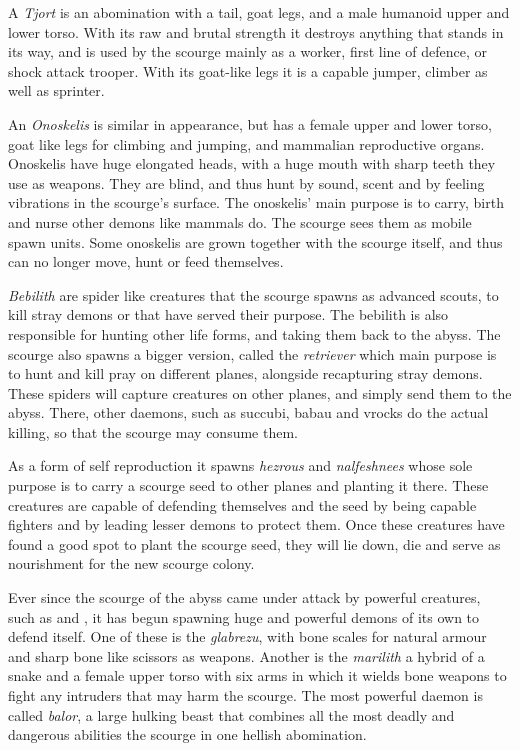 A \emph{Tjort} is an abomination with a tail, goat legs, and a male humanoid
upper and lower torso. With its raw and brutal strength it destroys anything
that stands in its way, and is used by the scourge mainly as a worker, first
line of defence, or shock attack trooper. With its goat-like legs it is a
capable jumper, climber as well as sprinter.

An \emph{Onoskelis} is similar in appearance, but has a female upper and lower
torso, goat like legs for climbing and jumping, and mammalian reproductive
organs. Onoskelis have huge elongated heads, with a huge mouth with sharp
teeth they use as weapons. They are blind, and thus hunt by sound, scent and
by feeling vibrations in the scourge's surface. The onoskelis' main purpose is
to carry, birth and nurse other demons like mammals do. The scourge sees them
as mobile spawn units. Some onoskelis are grown together with the scourge
itself, and thus can no longer move, hunt or feed themselves.

\emph{Bebilith} are spider like creatures that the scourge spawns as advanced
scouts, to kill stray demons or that have served their purpose. The bebilith
is also responsible for hunting other life forms, and taking them back to the
abyss. The scourge also spawns a bigger version, called the \emph{retriever}
which main purpose is to hunt and kill pray on different planes, alongside
recapturing stray demons. These spiders will capture creatures on other planes,
and simply send them to the abyss. There, other daemons, such as succubi,
babau and vrocks do the actual killing, so that the scourge may consume them.

As a form of self reproduction it spawns \emph{hezrous} and \emph{nalfeshnees}
whose sole purpose is to carry a scourge seed to other planes and planting
it there. These creatures are capable of defending themselves and the seed
by being capable fighters and by leading lesser demons to protect them. Once
these creatures have found a good spot to plant the scourge seed, they will
lie down, die and serve as nourishment for the new scourge colony.

Ever since the scourge of the abyss came under attack by powerful creatures,
such as  and , it has begun spawning
huge and powerful demons of its own to defend itself. One of these is the
\emph{glabrezu}, with bone scales for natural armour and sharp bone like
scissors as weapons. Another is the \emph{marilith} a hybrid of a snake and
a female upper torso with six arms in which it wields bone weapons to fight
any intruders that may harm the scourge. The most powerful daemon is called
\emph{balor}, a large hulking beast that combines all the most deadly and
dangerous abilities the scourge in one hellish abomination.

